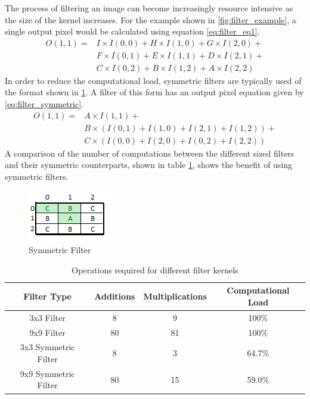 The process of filtering an image can become increasingly resource intensive as the size of the kernel increases.  For the example shown in \ref{fig:filter_example}, a single output pixel would be calculated using equation \eqref{eq:filter_eq1}.
\begin{equation}
  \begin{split}
  O(1,1) =& I\times I(0,0)+H\times I(1,0)+G\times I(2,0)+ \\
          &F\times I(0,1)+E\times I(1,1)+D\times I(2,1)+ \\
          &C\times I(0,2)+B\times I(1,2)+A\times I(2,2)
  \label{eq:filter_eq1}
  \end{split}
\end{equation}
In order to reduce the computational load, symmetric filters are typically used of the format shown in \ref{fig:filter_symmetric}. A filter of this form has an output pixel equation given by \eqref{eq:filter_symmetric}.
\begin{equation}
  \begin{split}
    O(1,1) =& A\times I(1,1)+ \\
            &B\times \left(I(0,1)+I(1,0)+I(2,1)+I(1,2)\right) +  \\
            &C\times \left(I(0,0)+I(2,0)+I(0,2)+I(2,2)\right)
  \label{eq:filter_symmetric}
  \end{split}
\end{equation}
A comparison of the number of computations between the different sized filters and their symmetric counterparts, shown in table \ref{tbl:filter_ops}, shows the benefit of using symmetric filters.
\begin{figure}[h]
  \centering
  \includegraphics{./img/filter_3x3_template.PNG}
  \caption{Symmetric Filter}
  \label{fig:filter_symmetric}
\end{figure} 

\begin{table}[h]
  \begin{tabular}{|c||c|c|c|}
    \hline 
    Filter Type & Additions & Multiplications & Computational Load \\ \hline \hline
    3x3 Filter &  8 & 9 & 100\%\\ \hline
    9x9 Filter & 80 & 81 & 100\% \\ \hline
    3x3 Symmetric Filter & 8 & 3 & 64.7\% \\ \hline
    9x9 Symmetric Filter & 80 & 15 & 59.0\% \\ \hline
  \end{tabular}
  \caption{Operations required for different filter kernels}
  \label{tbl:filter_ops}
\end{table}

